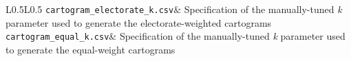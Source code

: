 \documentclass[11pt]{article}
\begin{document}
\begin{table}[!htb]
\begin{tabular}{L{0.5\linewidth}L{0.5\linewidth}}
		\texttt{cartogram\_electorate\_k.csv}\linebreak\phantom{a}\linebreak                & Specification of the manually-tuned \textit{k} parameter used to generate the electorate-weighted cartograms                                    \\[0.3in]
		\texttt{cartogram\_equal\_k.csv}\linebreak\phantom{a}\linebreak                     & Specification of the manually-tuned \textit{k} parameter used to generate the equal-weight cartograms                                           \\[0.3in]
		\bottomrule
	\end{tabular}
\end{table}
\end{document}
